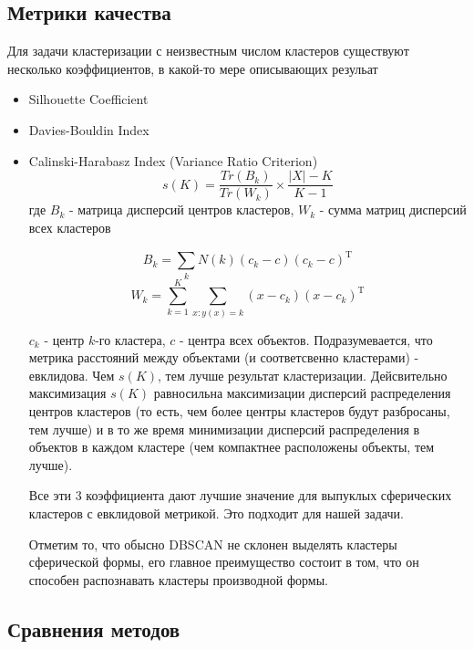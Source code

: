 \documentclass[12pt,fleqn]{article}
\begin{document}
\subsection{Метрики качества}
Для задачи кластеризации с неизвестным числом кластеров существуют несколько коэффициентов, в какой-то мере описывающих резульат

\begin{itemize}
  \item Silhouette Coefficient
  \item Davies-Bouldin Index
  \item Calinski-Harabasz Index (Variance Ratio Criterion) 
  $$s(K)= \frac{Tr(B_k)}{Tr(W_k)} \times \frac{|X|-K}{K-1}$$
  где $B_k$ - матрица дисперсий центров кластеров, $W_k$ - сумма матриц дисперсий всех кластеров
  
  $$B_k = \sum_{k}^{}N(k)(c_k-c)(c_k-c)^\mathrm{T}$$
  $$W_k = \sum_{k=1}^{K}\sum_{x:y(x)=k}^{}(x-c_k)(x-c_k)^\mathrm{T}$$
  
  $c_k$ - центр $k$-го кластера, $c$ - центра всех объектов. Подразумевается, что метрика расстояний между объектами (и соответсвенно кластерами) - евклидова.
  Чем $s(K)$, тем лучше результат кластеризации. Дейсвительно максимизация $s(K)$ равносильна максимизации дисперсий распределения центров кластеров (то есть, чем более центры кластеров будут разбросаны, тем лучше) и в то же время минимизации дисперсий распределения в объектов в каждом кластере (чем компактнее расположены объекты, тем лучше). 
  
  Все эти 3 коэффициента дают лучшие значение для выпуклых сферических кластеров с евклидовой метрикой. Это подходит для нашей задачи.
   
   Отметим то, что обысно DBSCAN не склонен выделять кластеры сферической формы, его главное преимущество состоит в том, что он способен распознавать кластеры производной формы.
\end{itemize}

\subsection{Сравнения методов}
 
\end{document}
